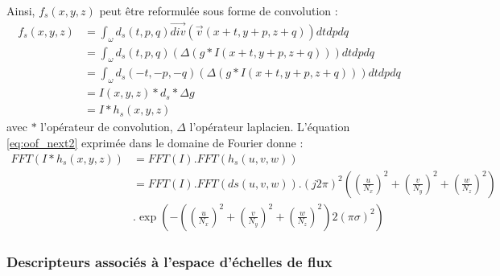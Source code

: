   Ainsi, $f_s(x,y,z)$ peut être reformulée sous forme de convolution :
  \begin{align}
    f_s(x,y,z) & = \int_{\omega} d_s(t,p,q) \vec{div}( \vec{v}(x+t,y+p, z+q) ) dtdpdq \\
    \nonumber
               & = \int_{\omega} d_s(t,p,q) (\Delta(g*I(x+t,y+p, z+q))) dtdpdq \\
               & = \int_{\omega} d_s(-t,-p,-q) (\Delta(g*I(x+t,y+p, z+q))) dtdpdq \\
               & = I(x,y,z) * d_s * \Delta g \\
               & = I * h_s(x,y,z)
    \label{eq:oof_next2}
  \end{align}
  avec $*$ l'opérateur de convolution, $\Delta$ l'opérateur laplacien.
  L'équation \ref{eq:oof_next2} exprimée dans le domaine de Fourier donne :
  \begin{align}
    FFT( I * h_s(x,y,z) ) &= FFT(I) . FFT(h_s(u,v,w)) \\
    \nonumber
                          &= FFT(I) . FFT(ds(u,v,w)) . (j2 \pi)^2 ( (\frac{u}{N_x})^2 + (\frac{v}{N_y})^2 + (\frac{w}{N_z})^2 )  \\
                          & . \exp( -( (\frac{u}{N_x})^2 + (\frac{v}{N_y})^2 + (\frac{w}{N_z})^2 ) 2(\pi\sigma)^2 )
  \end{align}
\subsubsection{Descripteurs associés à l'espace d'échelles de flux}

